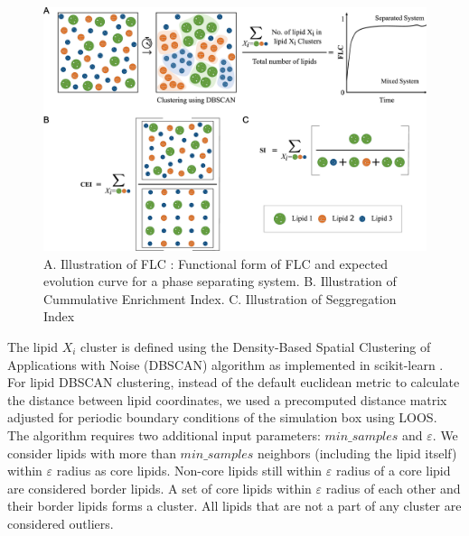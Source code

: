 \documentclass{biophys-new}
\begin{document}
\begin{figure}[hbt!]
\centering
\includegraphics[width=1\linewidth]{Figures/Main/2/placeholder.jpg}
\caption{A. Illustration of FLC :  Functional form of FLC and expected evolution curve for a phase separating system. B. Illustration of Cummulative Enrichment Index. C. Illustration of Seggregation Index}
\label{fig2:view}
\end{figure}


The lipid $X_i$ cluster is defined using the Density-Based Spatial Clustering of Applications with Noise (DBSCAN) algorithm \cite{MartinEsterHans-PeterKriegelJiirgSander1996, Ester2017} as implemented in scikit-learn \cite{PedregosaF.VaroquauxG.GramfortA.MichelV.ThirionB.GriselO.BlondelM.PrettenhoferP.WeissR.andDubourgV.VanderplasJ.PassosA.CournapeauD.BrucherM.PerrotM.Duchesnay2011}.
For lipid DBSCAN clustering, instead of the default euclidean metric to calculate the distance between lipid coordinates, we used a precomputed distance matrix adjusted for periodic boundary conditions of the simulation box using LOOS.
The algorithm requires two additional input parameters: $min\_samples$ and $\varepsilon$.
We consider lipids with more than $min\_samples$ neighbors (including the lipid itself) within $\varepsilon$ radius as core lipids.
Non-core lipids still within $\varepsilon$ radius of a core lipid are considered border lipids.
A set of core lipids within $\varepsilon$ radius of each other and their border lipids forms a cluster.
All lipids that are not a part of any cluster are considered outliers.
\end{document}
